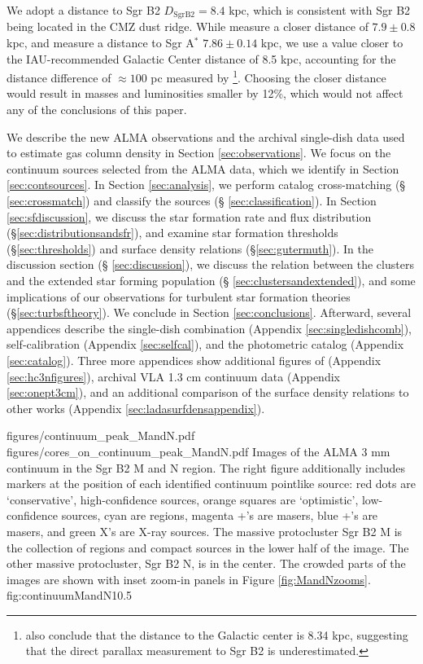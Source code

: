 \documentclass[twocolumn]{aastex61}
\newcommand{\dsgrb}{\ensuremath{8.4\textrm{~kpc}}\xspace}
\begin{document}
We adopt a distance to Sgr B2 $D_{\mathrm{Sgr B2}}=\dsgrb$, which is consistent
with Sgr B2 being located in the CMZ dust ridge.  While \citet{Reid2009a}
measure a closer distance of $7.9\pm0.8$ kpc, and \citet{Boehle2016a}
measure a distance to Sgr A$^*$ $7.86\pm0.14$ kpc, we use a value closer to the
IAU-recommended Galactic Center distance of 8.5 kpc, accounting for the
distance difference of $\approx100$ pc measured by
\citet{Reid2009a}\footnote{\citet{Reid2014a} also conclude that the distance to
the Galactic center is 8.34 kpc, suggesting that the direct parallax
measurement to Sgr B2 is underestimated.}.  Choosing the closer distance would
result in masses and luminosities smaller by 12\%, which would not affect any
of the conclusions of this paper.

We describe the new ALMA observations and the archival single-dish data used
to estimate gas column density in Section
\ref{sec:observations}. We focus on the continuum sources selected from the
ALMA data, which we identify in Section \ref{sec:contsources}.  In Section
\ref{sec:analysis}, we perform catalog cross-matching (\S
\ref{sec:crossmatch}) and classify the sources (\S
\ref{sec:classification}).  In Section \ref{sec:sfdiscussion}, we discuss the
star formation rate and flux distribution (\S \ref{sec:distributionsandsfr}),
and examine star formation thresholds (\S \ref{sec:thresholds})
and surface density relations (\S \ref{sec:gutermuth}).  In the discussion section (\S
\ref{sec:discussion}), we discuss
the
relation between the clusters and the extended star forming population (\S
\ref{sec:clustersandextended}), and some implications of our observations
for turbulent star formation theories (\S \ref{sec:turbsftheory}).  We conclude
in Section \ref{sec:conclusions}.  Afterward, several appendices describe the
single-dish combination (Appendix \ref{sec:singledishcomb}), self-calibration
(Appendix \ref{sec:selfcal}), and the photometric catalog (Appendix
\ref{sec:catalog}).  Three more appendices show additional figures of
\cyanoacetylene (Appendix \ref{sec:hc3nfigures}), archival VLA 1.3 cm continuum
data (Appendix \ref{sec:onept3cm}), and an additional comparison of the surface
density relations to other works (Appendix
\ref{sec:ladasurfdensappendix}).


\FigureTwo
{figures/continuum_peak_MandN.pdf}
{figures/cores_on_continuum_peak_MandN.pdf}
{Images of the ALMA 3 mm continuum in the Sgr B2 M and N region.  The right
figure additionally includes markers at the position of each identified
continuum pointlike source: red dots are `conservative', high-confidence
sources, orange squares are `optimistic', low-confidence sources, cyan are \hii
regions, magenta +'s are \methanol masers, blue +'s are \water masers, and
green X's are X-ray sources.  The massive
protocluster Sgr B2 M is the collection of \hii regions and compact sources in
the lower half of the image.  The other massive protocluster, Sgr B2 N, is in
the center.
The crowded parts of the images are shown with inset zoom-in panels in
Figure \ref{fig:MandNzooms}.
}
{fig:continuumMandN}{1}{0.5\textwidth}
\end{document}
